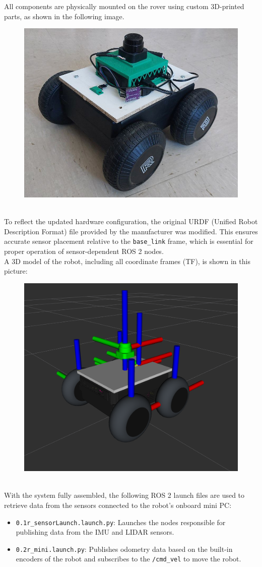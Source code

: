\newpage
All components are physically mounted on the rover using custom 3D-printed parts, as shown in the following image.
\begin{figure}[h]
	\centering
	\includegraphics[width=0.4\linewidth]{img/RoverwithSensor.jpg}
\end{figure}\\
To reflect the updated hardware configuration, the original URDF (Unified Robot Description Format) file provided by the manufacturer was modified. This ensures accurate sensor placement relative to the \texttt{base\_link} frame, which is essential for proper operation of sensor-dependent ROS 2 nodes.\\
A 3D model of the robot, including all coordinate frames (TF), is shown in this picture:
\begin{figure}[h]
\centering
\includegraphics[width=0.4\linewidth]{img/modelWithTFtree.png}
\end{figure}\\
With the system fully assembled, the following ROS 2 launch files are used to retrieve data from the sensors connected to the robot’s onboard mini PC:
\begin{itemize}
	\item \texttt{0.1r\_sensorLaunch.launch.py}: Launches the nodes responsible for publishing data from the IMU and LIDAR sensors.
	\item \texttt{0.2r\_mini.launch.py}: Publishes odometry data based on the built-in encoders of the robot and subscribes to the \texttt{/cmd\_vel} to move the robot.
\end{itemize}
